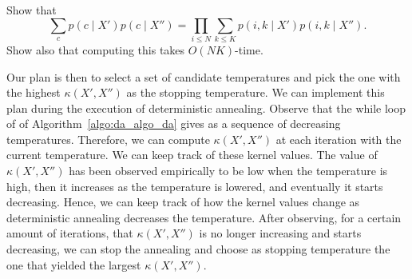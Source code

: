 \begin{exercise}
Show that
%
\begin{equation}
\sum_{c}p(c \mid X') p(c \mid X'') = \prod_{i \leq N}\sum_{k \leq K}p\left(i,k \mid X'\right)p\left(i,k \mid X''\right).
\end{equation}
%
Show also that computing this takes $O(NK)$-time.
\end{exercise}

Our plan is then to select a set of candidate temperatures and pick the
one with the highest $\kappa(X', X'')$ as the stopping temperature. We can implement
this plan during the execution of deterministic annealing. Observe
that the while loop of of Algorithm~\ref{algo:da_algo_da} gives as a sequence of decreasing
temperatures. Therefore, we can compute $\kappa(X', X'')$ at each iteration
with the current temperature. We can keep track of these kernel values.
The value of $\kappa(X', X'')$ has been observed empirically to be low when the
temperature is high, then it increases as the temperature is lowered, and
eventually it starts decreasing. Hence, we can keep track of how the kernel
values change as deterministic annealing decreases the temperature. After
observing, for a certain amount of iterations, that $\kappa(X', X'')$ is no longer
increasing and starts decreasing, we can stop the annealing and choose as
stopping temperature the one that yielded the largest $\kappa(X', X'')$.